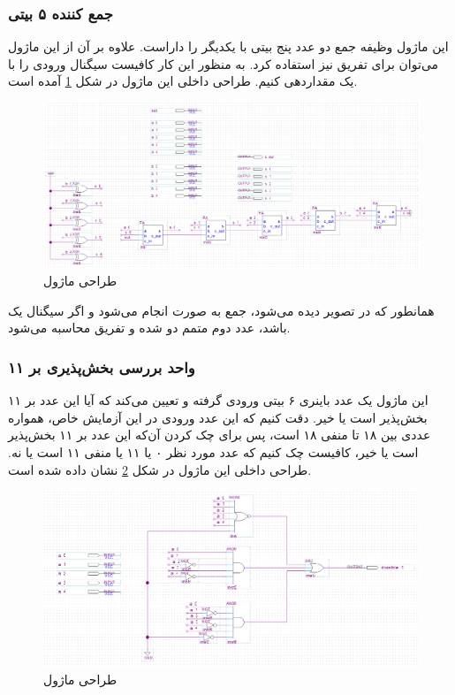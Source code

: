 \documentclass[12pt,onecolumn,a4paper,fleqn]{article}
\begin{document}
	\subsubsection{جمع کننده ۵ بیتی}
	این ماژول وظیفه جمع دو عدد پنج بیتی با یکدیگر را داراست. علاوه بر آن از این ماژول می‌توان برای تفریق نیز استفاده کرد. به منظور این کار کافیست سیگنال ورودی 
	را با یک مقداردهی کنیم. طراحی داخلی این ماژول در شکل \ref{add_sub} آمده است.
	\begin{figure}[H]
		\centering
		\includegraphics[scale=0.4]{source/adder_subtractor.png}
		\caption{طراحی ماژول }
		\label{add_sub}
	\end{figure}
	همانطور که در تصویر دیده می‌شود، جمع به صورت
	انجام می‌شود و اگر سیگنال
	یک باشد، عدد دوم متمم دو شده و تفریق محاسبه می‌شود.
	\subsubsection{واحد بررسی بخش‌پذیری بر ۱۱}
	این ماژول یک عدد باینری ۶ بیتی ورودی گرفته و تعیین می‌کند که آیا این عدد بر ۱۱ بخش‌پذیر است یا خیر. دقت کنیم که این عدد ورودی در این آزمایش خاص، همواره عددی بین ۱۸ تا منفی ۱۸ است، پس برای چک کردن آن‌که این عدد بر ۱۱ بخش‌پذیر است یا خیر، کافیست چک کنیم که عدد مورد نظر ۰ یا ۱۱ یا منفی ۱۱ است یا نه. طراحی داخلی این ماژول در شکل \ref{div_11} نشان داده شده است.
	\begin{figure}[H]
		\centering
		\includegraphics[scale=0.4]{source/isDiv11.png}
		\caption{طراحی ماژول }
		\label{div_11}
	\end{figure}
\end{document}
